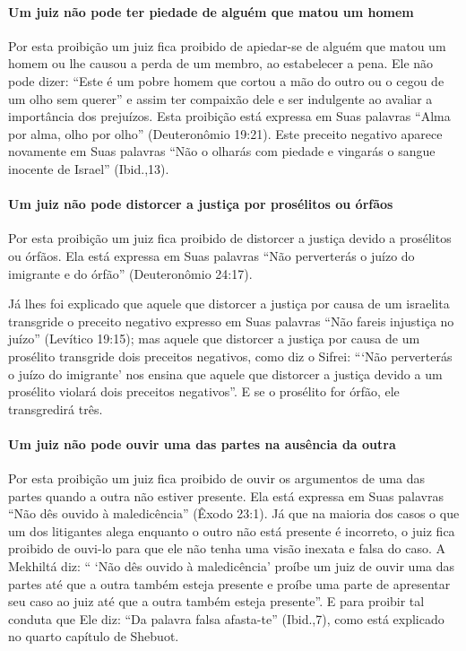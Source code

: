 \paragraph{Um juiz não pode ter piedade de alguém que matou um homem}

Por esta proibição um juiz fica proibido de apiedar-se de alguém que
matou um homem ou lhe causou a perda de um membro, ao estabelecer a
pena. Ele não pode dizer: ``Este é um pobre homem que cortou a mão do
outro ou o cegou de um olho sem querer'' e assim ter compaixão dele e
ser indulgente ao avaliar a importância dos prejuízos. Esta proibição
está expressa em Suas palavras ``Alma por alma, olho por olho''
(Deuteronômio 19:21). Este preceito negativo aparece novamente em Suas
palavras ``Não o olharás com piedade e vingarás o sangue inocente de
Israel'' (Ibid.,13).

\paragraph{Um juiz não pode distorcer a justiça por prosélitos ou órfãos}

Por esta proibição um juiz fica proibido de distorcer a justiça devido
a prosélitos ou órfãos. Ela está expressa em Suas palavras ``Não
perverterás o juízo do imigrante e do órfão'' (Deuteronômio 24:17).

Já lhes foi explicado que aquele que distorcer a justiça por causa de um
israelita transgride o preceito negativo expresso em Suas palavras ``Não
fareis injustiça no juízo'' (Levítico 19:15); mas aquele que distorcer
a justiça por causa de um prosélito transgride dois preceitos negativos,
como diz o Sifrei: ```Não perverterás o juízo do imigrante' nos ensina
que aquele que distorcer a justiça devido a um prosélito violará dois
preceitos negativos''. E se o prosélito for órfão, ele transgredirá
três.

\paragraph{Um juiz não pode ouvir uma das partes na ausência da outra}

Por esta proibição um juiz fica proibido de ouvir os argumentos de uma
das partes quando a outra não estiver presente. Ela está expressa em
Suas palavras ``Não dês ouvido à maledicência'' (Êxodo 23:1). Já que na
maioria dos casos o que um dos litigantes alega enquanto o outro não
está presente é incorreto, o juiz fica proibido de ouvi-lo para que ele
não tenha uma visão inexata e falsa do caso. A Mekhiltá diz: `` `Não dês
ouvido à maledicência' proíbe um juiz de ouvir uma das partes até que a
outra também esteja presente e proíbe uma parte de apresentar seu caso
ao juiz até que a outra também esteja presente''. E para proibir tal
conduta que Ele diz: ``Da palavra falsa afasta-te'' (Ibid.,7), como está
explicado no quarto capítulo de Shebuot.

